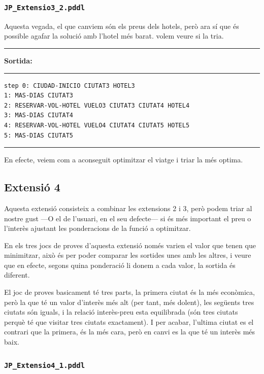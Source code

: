 \documentclass[11pt,a4paper]{article}
\begin{document}
\subsubsection*{\texttt{JP\_Extensio3\_2.pddl}}

Aquesta vegada, el que canviem són els preus dels hotels, però ara sí que és possible agafar la solució amb l'hotel més barat. volem veure si la tria.

\begin{samepage}
\medskip
\noindent
\rule{0.1\textwidth}{0.5mm}
\textbf{Sortida:}
\rule{0.76\textwidth}{0.5mm}
\begin{verbatim}
step 0: CIUDAD-INICIO CIUTAT3 HOTEL3
1: MAS-DIAS CIUTAT3
2: RESERVAR-VOL-HOTEL VUELO3 CIUTAT3 CIUTAT4 HOTEL4
3: MAS-DIAS CIUTAT4
4: RESERVAR-VOL-HOTEL VUELO4 CIUTAT4 CIUTAT5 HOTEL5
5: MAS-DIAS CIUTAT5
\end{verbatim}
\rule{\textwidth}{0.5mm}
\medskip
\end{samepage}

En efecte, veiem com a aconseguit optimitzar el viatge i triar la més optima.

\subsection{Extensió 4}

Aquesta extensió consisteix a combinar les extensions 2 i 3, però podem triar al nostre gust ---O el de l'usuari, en el seu defecte--- si és més important el preu o l'interès ajustant les ponderacions de la funció a optimitzar.

En els tres jocs de proves d'aquesta extensió només varien el valor que tenen que minimitzar, això és per poder comparar les sortides unes amb les altres, i veure que en efecte, segons quina ponderació li donem a cada valor, la sortida és diferent. 

El joc de proves basicament té tres parts, la primera ciutat és la més econòmica, però la que té un valor d'interès més alt (per tant, més dolent), les següents tres ciutats són iguals, i la relació interès-preu esta equilibrada (són tres ciutats perquè té que visitar tres ciutats exactament). I per acabar, l'ultima ciutat es el contrari que la primera, és la més cara, però en canvi es la que té un interès més baix.

\subsubsection*{\texttt{JP\_Extensio4\_1.pddl}}
\end{document}
